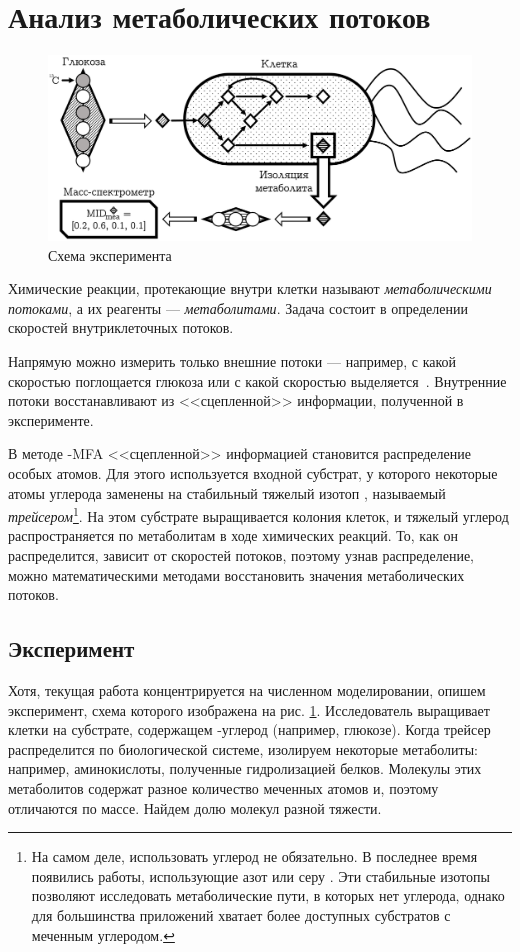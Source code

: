 \documentclass[14pt, a4paper]{extreport}
\begin{document}
	\section{Анализ метаболических потоков}
\begin{figure}[t]
	\includegraphics[width=1\textwidth]{experiment.png}\par
	\caption{Схема эксперимента}
	\label{experiment}
\end{figure}
Химические реакции, протекающие внутри клетки называют \emph{метаболическими потоками}, а их реагенты --- \emph{метаболитами}. Задача состоит в определении скоростей внутриклеточных потоков. 

Напрямую можно измерить только внешние потоки --- например, с какой скоростью поглощается глюкоза или с какой скоростью выделяется~. Внутренние потоки восстанавливают из <<сцепленной>> информации, полученной в эксперименте. 

В методе -MFA <<сцепленной>> информацией становится распределение особых атомов. Для этого используется входной субстрат, у которого некоторые атомы углерода заменены на стабильный тяжелый изотоп , называемый \emph{трейсером}\footnote{На самом деле, использовать углерод не обязательно. В последнее время появились работы, использующие  азот \cite{nitrogen_mfa} или  серу \cite{sulfur_mfa}. Эти стабильные изотопы позволяют исследовать метаболические пути, в которых нет углерода, однако для большинства приложений хватает более доступных субстратов с меченным углеродом.}.
На этом субстрате выращивается колония клеток, и тяжелый углерод распространяется по метаболитам в ходе химических реакций. То, как он распределится, зависит от скоростей потоков, поэтому узнав распределение, можно математическими методами восстановить значения метаболических потоков.



\subsection{Эксперимент}
Хотя, текущая работа концентрируется на численном моделировании, опишем эксперимент\cite[стр. 312]{protocol}, схема которого изображена на рис. \ref{experiment}. Исследователь выращивает клетки на субстрате, содержащем -углерод (например, глюкозе). Когда трейсер распределится по биологической системе, изолируем некоторые метаболиты: например, аминокислоты, полученные гидролизацией белков. Молекулы этих метаболитов содержат разное количество меченных атомов и, поэтому отличаются по массе. Найдем долю молекул разной тяжести. 
\end{document}
